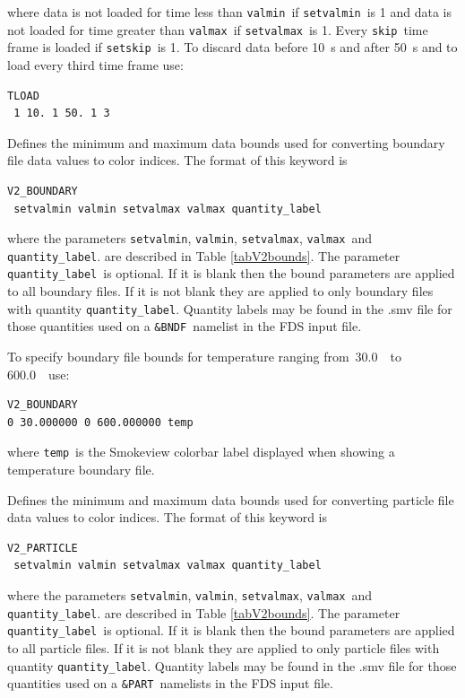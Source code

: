 \documentclass[11pt,twoside]{book}
\begin{document}
\noindent where data is not loaded for time
less than {\tt valmin}\ if {\tt setvalmin}\ is 1
and data is not loaded for time greater than {\tt valmax}\ if {\tt setvalmax}\ is 1.
Every {\tt skip}\ time frame is loaded if {\tt setskip}\ is 1.  To discard data before
10~s and after 50~s and to load every third time frame use:

\begin{lstlisting}
TLOAD
 1 10. 1 50. 1 3
\end{lstlisting}

Defines the minimum and maximum
data bounds used for converting boundary file data values to color indices.
The format of this keyword is
\begin{lstlisting}
V2_BOUNDARY
 setvalmin valmin setvalmax valmax quantity_label
\end{lstlisting}
where the parameters
{\tt setvalmin}, {\tt valmin}, {\tt setvalmax}, {\tt valmax}\ and {\tt quantity\_label}.
are described in Table \ref{tabV2bounds}.
The parameter {\tt quantity\_label}\ is optional.  If it is blank then the bound
parameters are applied to all boundary files.
If it is not blank they
are applied to only boundary files with quantity {\tt quantity\_label}.
Quantity labels may be found in the .smv file for those quantities used
on a {\tt \&BNDF}\ namelist in the FDS input file.

To specify boundary file bounds for temperature ranging from\
30.0~\degC\ to 600.0~\degC\ use:
\begin{lstlisting}
V2_BOUNDARY
0 30.000000 0 600.000000 temp
\end{lstlisting}
where {\tt temp}\ is the Smokeview colorbar label displayed when
showing a temperature boundary file.

Defines the minimum and maximum
data bounds used for converting particle file data values to color indices.
The format of this keyword is
\begin{lstlisting}
V2_PARTICLE
 setvalmin valmin setvalmax valmax quantity_label
\end{lstlisting}
where the parameters
{\tt setvalmin}, {\tt valmin}, {\tt setvalmax}, {\tt valmax}\ and {\tt quantity\_label}.
are described in Table \ref{tabV2bounds}.
The parameter {\tt quantity\_label}\ is optional.  If it is blank then the bound
parameters are applied to all particle files.
If it is not blank they
are applied to only particle files with quantity {\tt quantity\_label}.
Quantity labels may be found in the .smv file for those quantities used
on a {\tt \&PART}\ namelists in the FDS input file.
\end{document}
